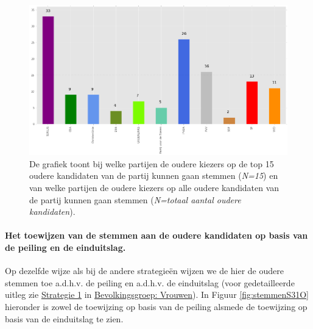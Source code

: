\begin{figure}[H]

	\includegraphics[width=\linewidth]	{top15_of_topN_kandidaten_ouderen.png}

			\caption{De grafiek toont bij welke partijen de oudere kiezers op de top 15 oudere kandidaten van de partij kunnen gaan stemmen (\textit{N=15}) en van welke partijen de oudere kiezers op alle oudere kandidaten van de partij kunnen gaan stemmen (\textit{N=totaal aantal oudere kandidaten}).} 


\label{fig:15O}
\end{figure}



\paragraph{Het toewijzen van de stemmen aan de oudere kandidaten op basis van de peiling en de einduitslag.}
Op dezelfde wijze als bij de andere strategie\"{e}n wijzen we de hier de oudere stemmen toe a.d.h.v. de peiling en a.d.h.v. de einduitslag (voor gedetailleerde uitleg zie \hyperref[S1V]{Strategie 1} in \hyperref[vrouwen]{Bevolkingsgroep: Vrouwen}). In Figuur \ref{fig:stemmenS31O} hieronder is zowel de toewijzing op basis van de peiling alsmede de toewijzing op basis van de einduitslag te zien.

